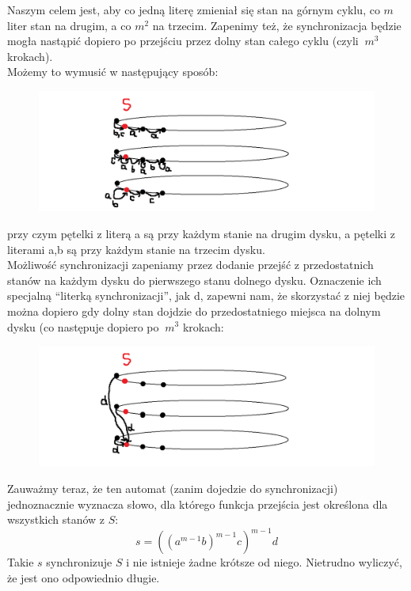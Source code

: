 \documentclass[a4paper,11pt]{article}
\begin{document}
Naszym celem jest, aby co jedną literę zmieniał się stan na górnym cyklu, co $m$ liter stan na drugim, a co $m^2$ na trzecim.
Zapenimy też, że synchronizacja będzie mogła nastąpić dopiero po przejściu przez dolny stan całego cyklu (czyli $~m^3$ krokach). \\
Możemy to wymusić w następujący sposób: \\

\begin{figure}[h!]
  \centerline{%
    \includegraphics[width=18cm]{zad42_2.png}%
  }%
\end{figure}

przy czym pętelki z literą a są przy każdym stanie na drugim dysku, a pętelki z literami a,b są przy każdym stanie na trzecim
dysku. \\
Możliwość synchronizacji zapeniamy przez dodanie przejść z przedostatnich stanów na każdym dysku do pierwszego stanu 
dolnego dysku. Oznaczenie ich specjalną ``literką synchronizacji'', jak d, zapewni nam, że skorzystać z niej będzie można
dopiero gdy dolny stan dojdzie do przedostatniego miejsca na dolnym dysku (co następuje dopiero po $~m^3$ krokach: \\
\begin{figure}[h!]
  \centerline{%
    \includegraphics[width=18cm]{zad42_3.png}%
  }%
\end{figure}

Zauważmy teraz, że ten automat (zanim dojedzie do synchronizacji) jednoznacznie wyznacza słowo, dla którego funkcja przejścia 
jest określona dla wszystkich stanów z $S$:
$$
s = ((a^{m-1}b)^{m-1}c)^{m-1}d
$$
Takie $s$ synchronizuje $S$ i nie istnieje żadne krótsze od niego. Nietrudno wyliczyć, że jest ono odpowiednio długie. \\ \\
\end{document}
